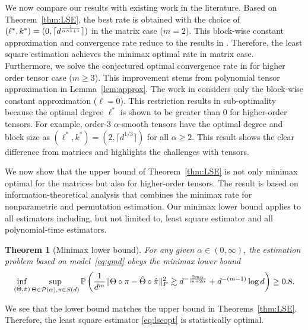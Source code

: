 \documentclass{article}
\newtheorem{thm}{Theorem}
\theoremstyle{definition}
\begin{document}




We now compare our results with existing work in the literature. Based on Theorem~\ref{thm:LSE}, the best rate is obtained with the choice of  $(\ell^*, k^*) = (0,\lceil d^{1\over\alpha\wedge1+1}\rceil)$ in the matrix case ($m =2$). This block-wise constant approximation and convergence rate reduce to the results in  \cite{gao2016optimal,klopp2017oracle}. Therefore, the least square estimation achieves the minimax optimal rate in matrix case. Furthermore, we solve the conjectured optimal convergence rate in \cite{balasubramanian2021nonparametric} for higher order tensor case ($m\geq 3$). This improvement stems from polynomial tensor approximation in Lemma~\ref{lem:approx}. The work in
\cite{balasubramanian2021nonparametric} considers only the block-wise constant approximation  ($\ell = 0$). This restriction results in sub-optimality because the optimal degree $\ell^*$ is shown to be greater than 0 for higher-order tensors. For example, order-3 $\alpha$-smooth tensors have the optimal degree and block size as $(\ell^*,k^*) = (2,\lceil d^{1/3}\rceil)$ for all $\alpha\geq 2.$  This result shows the clear difference from matrices and highlights the challenges with  tensors. 

We now show that the upper bound of Theorem~\ref{thm:LSE} is not only minimax optimal for the matrices but also for higher-order tensors.
The result is based on information-theoretical analysis that combines the minimax rate for nonparametric and permutation estimation. Our minimax lower bound applies to all estimators including, but not limited to, least square estimator and all polynomial-time estimators. 
\begin{thm}[Minimax lower bound]\label{thm:minimax}For any given $\alpha\in(0,\infty)$, the estimation problem based on model~\eqref{eq:gmd} obeys the minimax lower bound 
\begin{equation}\label{eq:minimax}
\inf_{(\hat \Theta,\hat \pi)}\sup_{\Theta\in \mathcal{P}(\alpha), \pi\in S(d)} \mathbb{P}\left({1\over d^m}\lVert\Theta\circ \pi-\hat \Theta\circ \hat \pi\rVert_F^2 \gtrsim d^{-{2m\alpha\over m+2\alpha}}+d^{-(m-1)}\log d \right) \geq 0.8.
\end{equation}
\end{thm}
We see that the lower bound matches the upper bound in Theorems~\ref{thm:LSE}. Therefore,
the least square estimator \eqref{eq:lseopt}  is statistically optimal.
\end{document}

